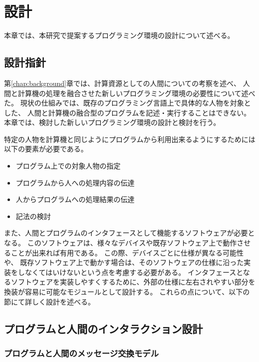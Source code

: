 \chapter{設計}\label{chap:design}

本章では、本研究で提案するプログラミング環境の設計について述べる。

\section{設計指針}\label{ux8a2dux8a08ux6307ux91dd}

第\ref{chap:background}章では、計算資源としての人間についての考察を述べ、
人間と計算機の処理を融合させた新しいプログラミング環境の必要性について述べた。
現状の仕組みでは、既存のプログラミング言語上で具体的な人物を対象とした、
人間と計算機の融合型のプログラムを記述・実行することはできない。
本章では、検討した新しいプログラミング環境の設計と検討を行う。

特定の人物を計算機と同じようにプログラムから利用出来るようにするためには以下の要素が必要である。

\begin{itemize}
\itemsep1pt\parskip0pt
\item
  プログラム上での対象人物の指定
\item
  プログラムから人への処理内容の伝達
\item
  人からプログラムへの処理結果の伝達
\item
  記法の検討
\end{itemize}

また、人間とプログラムのインタフェースとして機能するソフトウェアが必要となる。
このソフトウェアは、様々なデバイスや既存ソフトウェア上で動作させることが出来れば有用である。
この際、デバイスごとに仕様が異なる可能性や、
既存ソフトウェア上で動かす場合は、そのソフトウェアの仕様に沿った実装をしなくてはいけないという点を考慮する必要がある。
インタフェースとなるソフトウェアを実装しやすくするために、外部の仕様に左右されやすい部分を
換装が容易に可能なモジュールとして設計する。
これらの点について、以下の節にて詳しく設計を述べる。

\section{プログラムと人間のインタラクション設計}\label{sec:program-human-interaction-design}

\subsection{プログラムと人間のメッセージ交換モデル}\label{ux30d7ux30edux30b0ux30e9ux30e0ux3068ux4ebaux9593ux306eux30e1ux30c3ux30bbux30fcux30b8ux4ea4ux63dbux30e2ux30c7ux30eb}

